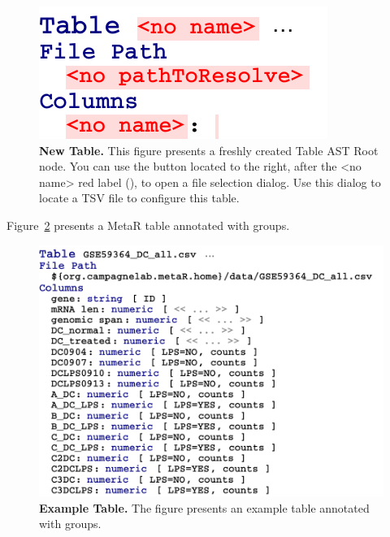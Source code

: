 \begin{figure}
  \includegraphics[width=\figWidthTiny]{figures/NewTable.pdf}
  \caption[New Table.]{\textbf{New Table.} This figure presents a freshly created Table AST Root node. You can use the button located to the right, after the <no name> red label (), to open a file selection dialog. Use this dialog to locate a TSV file to configure this table.}\label{fig:NewTable}
\end{figure}

Figure~\ref{fig:ExampleTable} presents a MetaR table annotated with groups. 

\begin{figure}[h!tbp]
  \centering
  \includegraphics[width=\figWidthWide]{figures/ExampleTable.pdf}
\caption[Example Table.]{\textbf{Example Table.} The figure presents an example table annotated with groups.}
\label{fig:ExampleTable}
\end{figure}



